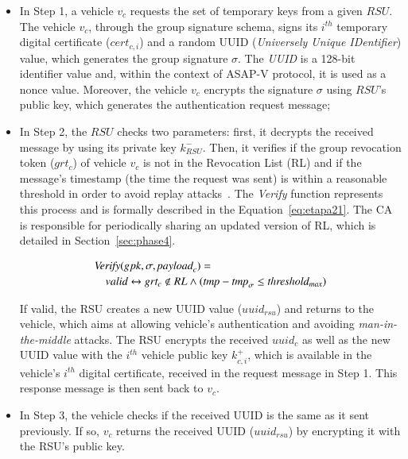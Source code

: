 \documentclass[preprint,12pt]{elsarticle}
\begin{document}
\begin{itemize}
	\item In Step 1, a vehicle $v_{c}$ requests the set of temporary keys from a given $RSU$. The vehicle $v_{c}$, through the group signature schema, signs its $i^{th}$ temporary digital certificate ($cert_{c,i}$) and a random UUID (\textit{Universely Unique IDentifier}) value, which generates the group signature $\sigma$. The \textit{UUID} is a 128-bit identifier value and, within the context of ASAP-V protocol, it is used as a nonce value. Moreover, the vehicle $v_{c}$ encrypts the signature $\sigma$ using $RSU$'s public key, which generates the authentication request message;
		
	\item  In Step 2, the $RSU$ checks two parameters: first, it decrypts the received message by using its private key $k^{-}_{RSU}$. Then, it verifies if the group revocation token ($grt_{c}$) of vehicle $v_{c}$ is not in the Revocation List (RL) and if the message's timestamp (the time the request was  sent) is within a reasonable threshold in order to avoid replay attacks~\cite{replay-attack}. The \textit{Verify} function represents this process and is formally described in the Equation~\ref{eq:etapa21}. The CA is responsible for periodically sharing an updated version of RL, which is detailed in Section~\ref{sec:phase4}.

	\begin{equation}
    \begin{multlined}
	\label{eq:etapa21}
		\mathrm{\textit{Verify}}(gpk, \sigma, \mathrm{\textit{payload}}_{c}) = \\
        \mathrm{\textit{valid}} \leftrightarrow grt_{c} \notin RL \wedge (\textrm{\textit{tmp}} - \mathrm{\textit{tmp}}_{\sigma} \le \mathrm{\textit{threshold}}_{\mathrm{\textit{max}}})
    \end{multlined}
	\end{equation}			
	
	If valid, the RSU creates a new UUID value ($uuid_{rsu}$) and returns to the vehicle, which aims at allowing vehicle's authentication and avoiding \textit{man-in-the-middle} attacks. The RSU encrypts the received $uuid_{c}$ as well as the new UUID value with the $i^{th}$ vehicle public key $k^{+}_{c,i}$, which is available in the vehicle's $i^{th}$ digital certificate, received in the request message in Step 1. This response message is then sent back to $v_c$.
	
	\item In Step 3, the vehicle checks if the received UUID is the same as it sent previously. If so, $v_{c}$ returns the received UUID ($uuid_{rsu}$) by encrypting it with the RSU's public key.
	

\end{itemize}
\end{document}
